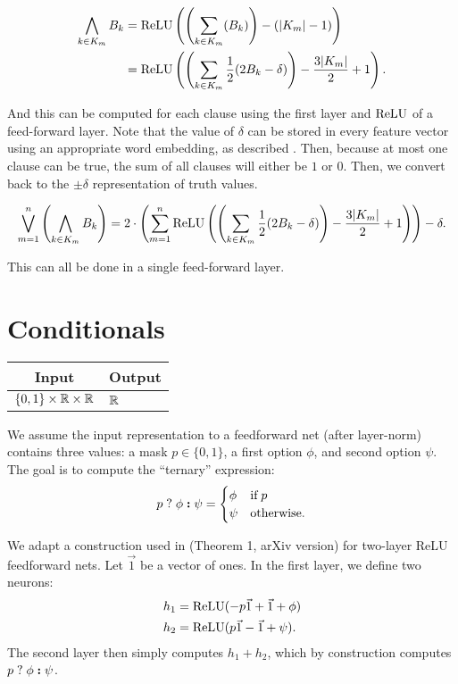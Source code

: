     \begin{align*}
    \bigwedge_{k\in K_m} B_k &= \text{ReLU}\left(\left(\sum_{k\in K_m} (B_k)\right) -(|K_m|-1)\right) \\ &=\text{ReLU}\left(\left(\sum_{k\in K_m} \frac{1}{2}(2B_k-\delta) \right) - \frac{3|K_m|}{2}+1\right).
    \end{align*}

    And this can be computed for each clause using the first layer and $\text{ReLU}$ of a feed-forward layer.
    Note that the value of $\delta$ can be stored in every feature vector using an appropriate word embedding, as described .
    Then, because at most one clause can be true, the sum of all clauses will either be $1$ or $0$. Then, we convert back to the $\pm\delta$ representation of truth values.

    \[\bigvee_{m=1}^n \left(\bigwedge_{k\in K_m} B_k \right)=2\cdot\left(\sum_{m=1}^n\text{ReLU}\left(\left(\sum_{k\in K_m} \frac{1}{2}(2B_k-\delta) \right) - \frac{3|K_m|}{2}+1\right)\right)-\delta.\]

    This can all be done in a single feed-forward layer.


\section{Conditionals}\label{sec:ffnn_conditional}

    \begin{tabular}{|c|p{1.5cm}|}
        \hline
        \rowcolor{orange!20} %
        \textbf{Input} & \textbf{Output} \\
        \hline
        $\{0,1\}\times \mathbb{R}\times\mathbb{R}$ & $\mathbb{R}$ \\
        \hline
    \end{tabular}

    We assume the input representation to a feedforward net (after layer-norm) contains three values: a mask $p \in \{0, 1\}$, a first option $\phi$, and second option $\psi$. The goal is to compute the ``ternary'' expression:
    \begin{equation*}
        p\;\mathbf{?}\; \phi\; \textbf{:} \;\psi =
        \begin{cases}
            \phi & \textrm{if} \; p \\
            \psi & \textrm{otherwise.}
        \end{cases}
    \end{equation*}

    We adapt a construction used in \citep{merrill2024the} (Theorem 1, arXiv version) for two-layer ReLU feedforward nets.
    Let $\vec 1$ be a vector of ones.
    In the first layer, we define two neurons:
    \begin{align*}
        h_1 &= \text{ReLU}(-p \vec 1 + \vec 1 + \phi) \\
        h_2 &= \text{ReLU}(p \vec 1 - \vec 1 + \psi) .
    \end{align*}
    The second layer then simply computes $h_1 + h_2$, which by construction computes $p\;\mathbf{?}\; \phi\; \textbf{:} \;\psi$.

